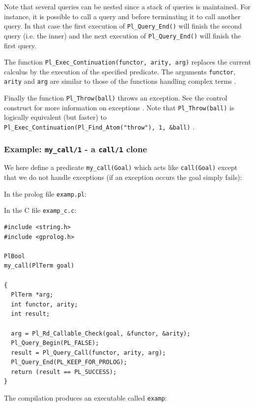 Note that several queries can be nested since a stack of queries is
maintained. For instance, it is possible to call a query and before
terminating it to call another query. In that case the first execution of
\texttt{Pl\_Query\_End()} will finish the second query (i.e. the inner) and
the next execution of \texttt{Pl\_Query\_End()} will finish the first query.

The function \texttt{Pl\_Exec\_Continuation(functor, arity, arg)}
replaces the current calculus by the execution of the specified
predicate. The arguments \texttt{functor}, \texttt{arity} and \texttt{arg}
are similar to those of the functions handling complex terms
.

Finally the function \texttt{Pl\_Throw(ball)} throws an exception. See the
 control construct for more information on exceptions
. Note that \texttt{Pl\_Throw(ball)} is logically equivalent (but
faster)
to \texttt{Pl\_Exec\_Continuation(Pl\_Find\_Atom("throw"), 1, \&ball)} .

\subsubsection{Example: \texttt{my\_call/1} - a \texttt{call/1} clone}

We here define a predicate \texttt{my\_call(Goal)} which acts like
\texttt{call(Goal)} except that we do not handle exceptions (if an exception
occurs the goal simply fails):

In the prolog file \texttt{examp.pl}:


In the C file \texttt{examp\_c.c}:

\begin{Code}
\begin{verbatim}
#include <string.h>
#include <gprolog.h>

PlBool
my_call(PlTerm goal)

{
  PlTerm *arg;
  int functor, arity;
  int result;

  arg = Pl_Rd_Callable_Check(goal, &functor, &arity);
  Pl_Query_Begin(PL_FALSE);
  result = Pl_Query_Call(functor, arity, arg);
  Pl_Query_End(PL_KEEP_FOR_PROLOG);
  return (result == PL_SUCCESS);
}
\end{verbatim}
\end{Code}

The compilation produces an executable called \texttt{examp}:


